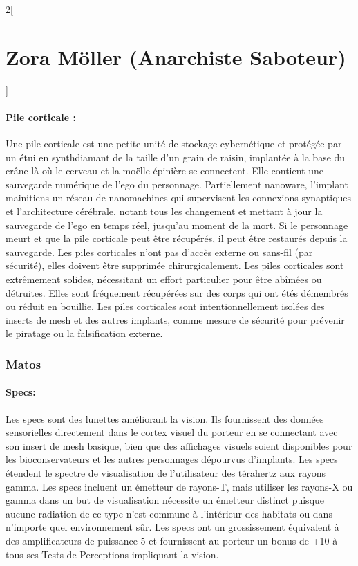 \documentclass[a4paper,9pt]{article}
\begin{document}
\begin{multicols}{2}[\section*{Zora Möller (Anarchiste Saboteur)}]
   \paragraph{Pile corticale :}
   Une pile corticale est une petite unité de stockage cybernétique et protégée
   par un étui en synthdiamant de la taille d'un grain de raisin, implantée à la
   base du crâne là où le cerveau et la moëlle épinière se connectent. Elle
   contient une sauvegarde numérique de l'ego du personnage. Partiellement
   nanoware, l'implant mainitiens un réseau de nanomachines qui supervisent
   les connexions synaptiques et l'architecture cérébrale, notant tous les
   changement et mettant à jour la sauvegarde de l'ego en temps réel, jusqu'au
   moment de la mort. Si le personnage meurt et que la pile corticale peut être
   récupérés, il peut être restaurés depuis la sauvegarde. Les piles corticales
   n'ont pas d'accès externe ou sans-fil (par sécurité), elles doivent être
   supprimée chirurgicalement. Les piles corticales sont extrêmement solides,
   nécessitant un effort particulier pour être abîmées ou détruites. Elles sont
   fréquement récupérées sur des corps qui ont étés démembrés ou réduit en
   bouillie. Les piles corticales sont intentionnellement isolées des inserts de
   mesh et des autres implants, comme mesure de sécurité pour prévenir le piratage
   ou la falsification externe.

   \subsubsection*{Matos}

   \paragraph{Specs:} Les specs sont des lunettes améliorant la vision. Ils
   fournissent des données sensorielles directement dans le cortex visuel
   du porteur en se connectant avec son insert de mesh basique, bien que
   des affichages visuels soient disponibles pour les bioconservateurs et les
   autres personnages dépourvus d'implants. Les specs étendent le spectre de
   visualisation de l'utilisateur des térahertz aux rayons gamma. Les
   specs incluent un émetteur de rayons-T, mais utiliser les rayons-X ou
   gamma dans un but de visualisation nécessite un émetteur distinct puisque
   aucune radiation de ce type n'est commune à l'intérieur des habitats ou dans
   n'importe quel environnement sûr. Les specs ont un grossissement équivalent à
   des amplificateurs de puissance 5 et fournissent au porteur un bonus de +10 à
   tous ses Tests de Perceptions impliquant la vision.

\end{multicols}
\end{document}
